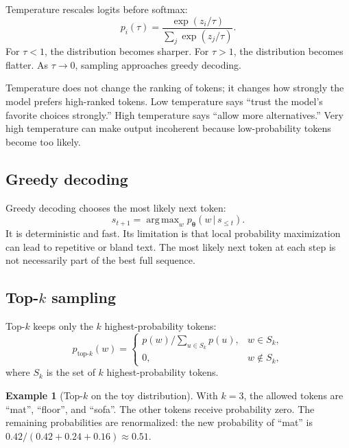 \documentclass[11pt,a4paper]{article}
\theoremstyle{definition}
\newtheorem{example}{Example}[section]
\theoremstyle{plain}
\newcommand{\vtheta}{\bm{\theta}}
\newcommand{\given}{\,|\,}
\DeclareMathOperator{\argmax}{arg\,max}
\begin{document}
Temperature rescales logits before softmax:
\begin{equation}
    p_i(\tau)=\frac{\exp(z_i/\tau)}{\sum_j\exp(z_j/\tau)}.
\end{equation}
For $\tau<1$, the distribution becomes sharper. For $\tau>1$, the distribution becomes flatter. As $\tau\to0$, sampling approaches greedy decoding.

\begin{intuitionbox}
Temperature does not change the ranking of tokens; it changes how strongly the model prefers high-ranked tokens. Low temperature says ``trust the model's favorite choices strongly.'' High temperature says ``allow more alternatives.'' Very high temperature can make output incoherent because low-probability tokens become too likely.
\end{intuitionbox}

\subsection{Greedy decoding}

Greedy decoding chooses the most likely next token:
\begin{equation}
    s_{t+1}=\argmax_{w} p_{\vtheta}(w\given s_{\leq t}).
\end{equation}
It is deterministic and fast. Its limitation is that local probability maximization can lead to repetitive or bland text. The most likely next token at each step is not necessarily part of the best full sequence.

\subsection{Top-$k$ sampling}

Top-$k$ keeps only the $k$ highest-probability tokens:
\begin{equation}
    p_{\mathrm{top}\text{-}k}(w)=\begin{cases}
        p(w)/\sum_{u\in S_k}p(u), & w\in S_k,\\
        0, & w\notin S_k,
    \end{cases}
\end{equation}
where $S_k$ is the set of $k$ highest-probability tokens.

\begin{example}[Top-$k$ on the toy distribution]
With $k=3$, the allowed tokens are ``mat'', ``floor'', and ``sofa''. The other tokens receive probability zero. The remaining probabilities are renormalized: the new probability of ``mat'' is $0.42/(0.42+0.24+0.16)\approx0.51$.
\end{example}
\end{document}
